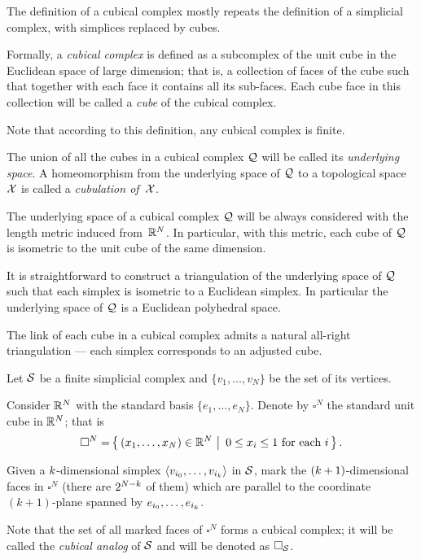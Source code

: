 The definition of a cubical complex
mostly repeats the definition of a simplicial complex, 
with simplices replaced by cubes.

Formally, a \emph{cubical complex} is defined as a subcomplex 
of the unit cube in the Euclidean space of large dimension;
that is, a collection of faces of the cube
such that together with each face it contains all its sub-faces.
Each cube face in this collection 
will be called a \emph{cube} of the cubical complex.

Note that according to this definition, 
any cubical complex is finite.

The union of all the cubes in a cubical complex $\mathcal{Q}$ will be called its \emph{underlying space}.
A homeomorphism from the underlying space of $\mathcal{Q}$ to a topological space $\mathcal{X}$ is called a \emph{cubulation of}~$\mathcal{X}$.

The underlying space of a cubical complex $\mathcal{Q}$ will be always considered with the length metric
induced from~$\mathbb{R}^N$.
In particular, with this metric, 
each cube of $\mathcal{Q}$ is isometric to the unit cube of the same dimension.

It is straightforward to construct a triangulation 
of the underlying space of $\mathcal{Q}$ 
such that each simplex is isometric to a Euclidean simplex.
In particular the underlying space of $\mathcal{Q}$ is a Euclidean polyhedral space.

The link of each cube in a cubical complex admits a natural 
all-right triangulation --- each simplex corresponds to an adjusted cube.

Let $\mathcal{S}$ be a finite simplicial complex and $\{v_1,\dots,v_N\}$ be the set of its vertices.

Consider $\mathbb{R}^N$ with the standard basis $\{e_1,\dots,e_N\}$.
Denote by $\square^N$ the standard unit cube in $\mathbb{R}^N$;
that is 
\[\square^N=\set{(x_1,\dots,x_N)\in \RR^N}{0\le x_i\le 1\ \text{for each}\ i}.\]

Given a $k$-dimensional simplex $\<v_{i_0},\dots,v_{i_\kay}\>$ in $\mathcal{S}$, 
mark the $(\kay\z+1)$-dimensional faces in $\square^N$ (there are  $2^{N-k}$ of them)
which are parallel to the coordinate $(k+1)$-plane 
spanned by $e_{i_0},\dots,e_{i_\kay}$.


Note that the set of all marked faces of $\square^{N}$
forms a cubical complex;
it will be called 
the \emph{cubical analog} of $\mathcal{S}$
and will be denoted as $\square_{\mathcal{S}}$.

